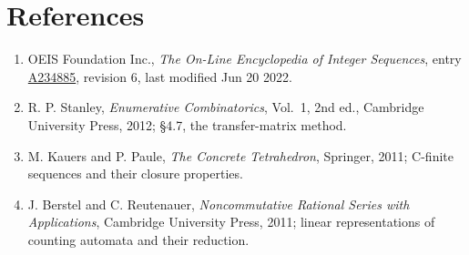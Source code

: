 \documentclass[11pt]{article}
\theoremstyle{definition}
\begin{document}
\section{References}

\begin{enumerate}

\item OEIS Foundation Inc., \emph{The On-Line Encyclopedia of Integer Sequences}, entry \href{https://oeis.org/A234885}{A234885}, revision 6, last modified Jun 20 2022.

\item R. P. Stanley, \emph{Enumerative Combinatorics}, Vol.~1, 2nd ed., Cambridge University Press, 2012; \S4.7, the transfer-matrix method.

\item M. Kauers and P. Paule, \emph{The Concrete Tetrahedron}, Springer, 2011; C-finite sequences and their closure properties.

\item J. Berstel and C. Reutenauer, \emph{Noncommutative Rational Series with Applications}, Cambridge University Press, 2011; linear representations of counting automata and their reduction.

\end{enumerate}
\end{document}
